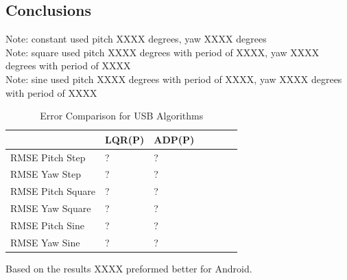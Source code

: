 \subsection{Conclusions}
Note: constant used pitch XXXX degrees, yaw XXXX degrees\\
Note: square used pitch XXXX degrees with period of XXXX, yaw XXXX degrees with period of XXXX\\
Note: sine used pitch XXXX degrees with period of XXXX, yaw XXXX degrees with period of XXXX\\
\begin{table}[h!]
    \centering
    \begin{tabular}{l|l|l|l|l|l|l}
        \toprule
        \textbf{} & \textbf{LQR(P)} & \textbf{ADP(P)} \\
        \toprule
        RMSE Pitch Step & ? & ?  \\
        RMSE Yaw Step & ? & ? \\
        RMSE Pitch Square & ? & ? \\
        RMSE Yaw Square & ? & ? \\
        RMSE Pitch Sine & ? & ? \\
        RMSE Yaw Sine & ? & ? \\
        \bottomrule
    \end{tabular}
    \caption{Error Comparison for USB Algorithms}
    \label{tab:USB_RMSE}
\end{table}
Based on the results XXXX preformed better for Android.



